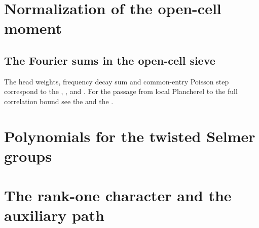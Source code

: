 \section{Normalization of the open-cell moment}









\subsection{The Fourier sums in the open-cell sieve}\label{moment:sieve}



The head weights, frequency decay sum and common-entry Poisson step correspond to the
,
, and
.
For the passage from local Plancherel to the full correlation bound see the
and the .

\section{Polynomials for the twisted Selmer groups}





\section{The rank-one character and the auxiliary path}





